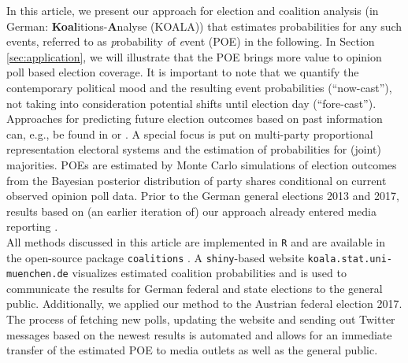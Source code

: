 \documentclass[smallcondensed]{svjour3_edited}     %
\begin{document}
In this article, we present our approach for election and coalition analysis
(in German: \textbf{Koal}itions-\textbf{A}nalyse (KOALA)) that estimates probabilities
for any such events, referred to as \emph{p}robability \emph{o}f \emph{e}vent (POE)
in the following. In Section \ref{sec:application}, we will illustrate that the
POE brings more value to opinion poll based election coverage.
It is important to note that we quantify the contemporary political mood
and the resulting event probabilities (``now-cast''), not taking into consideration
potential shifts until election day (``fore-cast''). Approaches for predicting
future election outcomes based on past information can, e.g., be found in
\citet{graefe_2017} or \citet{norpoth_gschwend_2010}. A special focus is put on
multi-party proportional representation electoral systems and the estimation
of probabilities for (joint) majorities. POEs are estimated by Monte Carlo
simulations of election outcomes from the Bayesian posterior distribution of party
shares conditional on current observed opinion poll data. Prior to the German general
elections 2013 and 2017, results based on (an earlier iteration of) our approach
already entered media reporting \citep[cf.][]{wahlistik_2013, gelitz_2017}.\\

All methods discussed in this article are implemented in \texttt{R} \citep{r_2017}
and are available in the open-source package \texttt{coalitions} \citep{bender_bauer_2018}.
A \texttt{shiny}-based \citep{chang_2017} website
\texttt{koala.stat.uni-\allowbreak muenchen.\allowbreak de} visualizes estimated
coalition probabilities and is used to communicate the results for German federal
and state elections to the general public. Additionally, we applied our method
to the Austrian federal election 2017. The process of fetching new polls,
updating the website and sending out Twitter messages based on the newest results
is automated and allows for an immediate transfer of the estimated POE
to media outlets as well as the general public.
\end{document}

